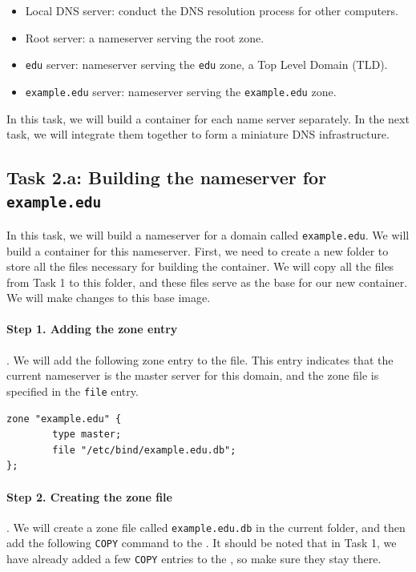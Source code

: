 \begin{itemize}[nosep]
\item Local DNS server: conduct the DNS resolution process for other computers.
\item Root server: a nameserver serving the root zone.
\item \texttt{edu} server: nameserver serving the \texttt{edu} zone, a Top Level Domain (TLD).  
\item \texttt{example.edu} server: nameserver serving the \texttt{example.edu} zone. 
\end{itemize}




In this task, we will build a container for each name server separately. In the next
task, we will integrate them together to form a miniature DNS infrastructure. 
 


\subsection{Task 2.a: Building the nameserver for \texttt{example.edu}}

In this task, we will build a nameserver for a domain 
called \texttt{example.edu}. We will build a container 
for this nameserver. First, we need to create a new folder to
store all the files necessary for building the container.
We will copy all the files from Task 1 to this folder, and these files serve
as the base for our new container. We will make changes to this base image. 


\paragraph{Step 1. Adding the zone entry}. We will 
add the following zone entry to the 
 file. This entry indicates that the current nameserver 
is the master server for this domain, and the zone file is 
specified in the \texttt{file} entry.  


\begin{lstlisting}
zone "example.edu" {
        type master;
        file "/etc/bind/example.edu.db";
};
\end{lstlisting}


\paragraph{Step 2. Creating the zone file}. We will 
create a zone file called \texttt{example.edu.db} 
in the current folder, and then add the following
\texttt{COPY} command to the \dockerfile. It should be 
noted that in Task 1, we have already added a few 
\texttt{COPY} entries to the \dockerfile, so make sure they 
stay there. 


